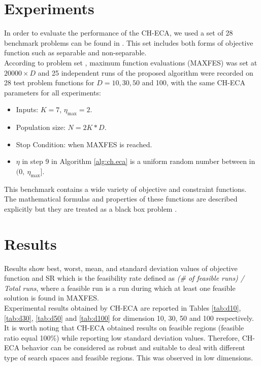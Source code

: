 \documentclass[conference]{IEEEtran}
\begin{document}

\section{Experiments} %
\label{sec:experiments}

In order to evaluate the performance of the CH-ECA, we used a set of
28 benchmark problems can be found in \cite{cecCop17}. This set includes both forms of objective function such as separable and non-separable.\\

According to problem set \cite{cecCop17}, maximum function evaluations (MAXFES) was set at $20000 \times D$ and 25
independent runs of the proposed algorithm were recorded on
28 test problem functions for $D = 10, 30, 50$ and 100, with the same CH-ECA parameters for all experiments:

\begin{itemize}
	\item Inputs: $K = 7$, $\eta_{\max} = 2$. 
	\item Population size: $N = 2K * D$.
	\item Stop Condition: when MAXFES is reached.
	\item $\eta$ in step 9 in Algorithm \ref{alg:ch.eca} is a uniform random number between in $(0,\ \eta_{\max} ]$.
\end{itemize}

This benchmark contains a wide variety of objective and constraint functions. The mathematical formulas and properties of these functions are described explicitly but they are treated as a black box problem \cite{jones1998efficient}.


\section{Results} %
\label{sec:results}

Results show best, worst, mean, and standard deviation values of objective function and SR which is the feasibility rate defined as \textit{(\# of feasible runs) / Total runs}, where a feasible run is a run during which at least one feasible solution is found in MAXFES.\\
% 

Experimental results obtained by CH-ECA are reported in Tables \ref{tab:d10}, \ref{tab:d30}, \ref{tab:d50} and \ref{tab:d100} for dimension 10, 30, 50 and 100 respectively. It is worth noting that CH-ECA obtained results on feasible regions (feasible ratio equal 100\%) while reporting low standard deviation values. Therefore, CH-ECA behavior can be considered as robust and suitable to deal with different type of search spaces and feasible regions. This was observed in low dimensions. \\
% 
\end{document}
